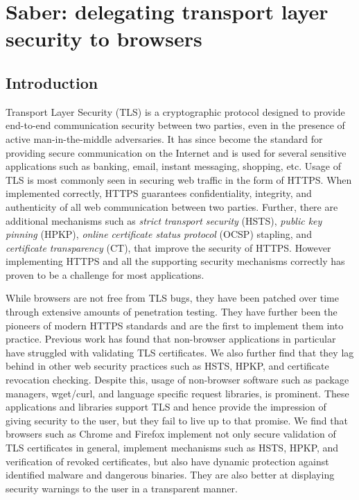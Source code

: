 \chapter{Saber: delegating transport layer security to browsers}

\section{Introduction}
\label{sec:intro-saber}

Transport Layer Security (TLS) is a cryptographic protocol designed to provide
end-to-end communication security between two parties, even in the presence of
active man-in-the-middle adversaries. It has since become the standard for
providing secure communication on the Internet and is used for several
sensitive applications such as banking, email, instant messaging, shopping,
etc. Usage of TLS is most commonly seen in securing web traffic in the form of
HTTPS. When implemented correctly, HTTPS guarantees confidentiality, integrity,
and authenticity of all web communication between two parties. Further, there
are additional mechanisms such as \emph{strict transport security} (HSTS),
\emph{public key pinning} (HPKP), \emph{online certificate status protocol}
(OCSP) stapling, and \emph{certificate transparency} (CT), that improve the
security of HTTPS. However implementing HTTPS and all the supporting security
mechanisms correctly has proven to be a challenge for most applications.

While browsers are not free from TLS bugs, they have been patched over time
through extensive amounts of penetration testing. They have further been the
pioneers of modern HTTPS standards and are the first to implement them into
practice. Previous work has found that non-browser applications in particular
have struggled with validating TLS certificates\cite{dangerous}. We also
further find that they lag behind in other web security practices such as HSTS,
HPKP, and certificate revocation checking. Despite this, usage of non-browser
software such as package managers, wget/curl, and language specific request
libraries, is prominent. These applications and libraries support TLS and hence
provide the impression of giving security to the user, but they fail to live up
to that promise. We find that browsers such as Chrome and Firefox implement not
only secure validation of TLS certificates in general, implement mechanisms
such as HSTS, HPKP, and verification of revoked certificates, but also have
dynamic protection against identified malware and dangerous binaries. They are
also better at displaying security warnings to the user in a transparent
manner.

